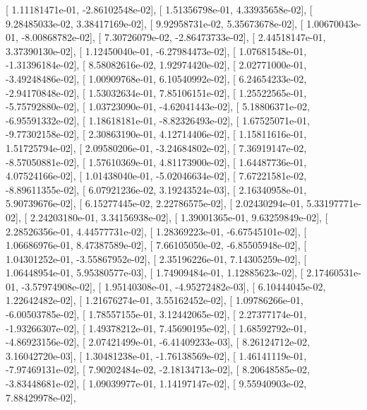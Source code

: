 \documentclass{article}
\begin{document}
       [  1.11181471e-01,  -2.86102548e-02],
       [  1.51356798e-01,   4.33935658e-02],
       [  9.28485033e-02,   3.38417169e-02],
       [  9.92958731e-02,   5.35673678e-02],
       [  1.00670043e-01,  -8.00868782e-02],
       [  7.30726079e-02,  -2.86473733e-02],
       [  2.44518147e-01,   3.37390130e-02],
       [  1.12450040e-01,  -6.27984473e-02],
       [  1.07681548e-01,  -1.31396184e-02],
       [  8.58082616e-02,   1.92974420e-02],
       [  2.02771000e-01,  -3.49248486e-02],
       [  1.00909768e-01,   6.10540992e-02],
       [  6.24654233e-02,  -2.94170848e-02],
       [  1.53032634e-01,   7.85106151e-02],
       [  1.25522565e-01,  -5.75792880e-02],
       [  1.03723090e-01,  -4.62041443e-02],
       [  5.18806371e-02,  -6.95591332e-02],
       [  1.18618181e-01,  -8.82326493e-02],
       [  1.67525071e-01,  -9.77302158e-02],
       [  2.30863190e-01,   4.12714406e-02],
       [  1.15811616e-01,   1.51725794e-02],
       [  2.09580206e-01,  -3.24684802e-02],
       [  7.36919147e-02,  -8.57050881e-02],
       [  1.57610369e-01,   4.81173900e-02],
       [  1.64487736e-01,   4.07524166e-02],
       [  1.01438040e-01,  -5.02046634e-02],
       [  7.67221581e-02,  -8.89611355e-02],
       [  6.07921236e-02,   3.19243524e-03],
       [  2.16340958e-01,   5.90739676e-02],
       [  6.15277445e-02,   2.22786575e-02],
       [  2.02430294e-01,   5.33197771e-02],
       [  2.24203180e-01,   3.34156938e-02],
       [  1.39001365e-01,   9.63259849e-02],
       [  2.28526356e-01,   4.44577731e-02],
       [  1.28369223e-01,  -6.67545101e-02],
       [  1.06686976e-01,   8.47387589e-02],
       [  7.66105050e-02,  -6.85505948e-02],
       [  1.04301252e-01,  -3.55867952e-02],
       [  2.35196226e-01,   7.14305259e-02],
       [  1.06448954e-01,   5.95380577e-03],
       [  1.74909484e-01,   1.12885623e-02],
       [  2.17460531e-01,  -3.57974908e-02],
       [  1.95140308e-01,  -4.95272482e-03],
       [  6.10444045e-02,   1.22642482e-02],
       [  1.21676274e-01,   3.55162452e-02],
       [  1.09786266e-01,  -6.00503785e-02],
       [  1.78557155e-01,   3.12442065e-02],
       [  2.27377174e-01,  -1.93266307e-02],
       [  1.49378212e-01,   7.45690195e-02],
       [  1.68592792e-01,  -4.86923156e-02],
       [  2.07421499e-01,  -6.41409233e-03],
       [  8.26124712e-02,   3.16042720e-03],
       [  1.30481238e-01,  -1.76138569e-02],
       [  1.46141119e-01,  -7.97469131e-02],
       [  7.90202484e-02,  -2.18134713e-02],
       [  8.20648585e-02,  -3.83448681e-02],
       [  1.09039977e-01,   1.14197147e-02],
       [  9.55940903e-02,   7.88429978e-02],
\end{document}

